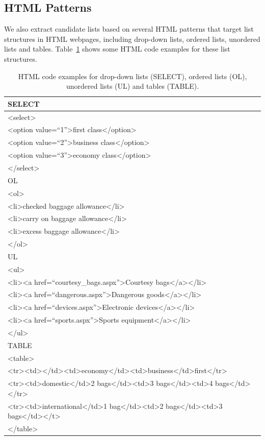 \subsection{HTML Patterns}
We also extract candidate lists based on several HTML patterns that target list structures in HTML webpages, including drop-down lists, ordered lists, unordered lists and tables. Table~\ref{tab:facet-html} shows some HTML code examples for these list structures.
\begin{table}[!ht]
\centering
\caption{HTML code examples for drop-down lists (SELECT), ordered lists (OL), unordered lists (UL) and tables (TABLE).} 
\label{tab:facet-html}
\begin{tabular}{|l|} \hline
SELECT \\\hline
<select>\\
<option value=``1''>first class</option>\\
<option value=``2''>business class</option>\\
<option value=``3''>economy class</option>\\
</select>\\\hline
OL \\\hline
<ol>\\
<li>checked baggage allowance</li>\\
<li>carry on baggage allowance</li>\\
<li>excess baggage allowance</li>\\
</ol>\\\hline
UL \\\hline
<ul> \\
<li><a href=``courtesy\_bags.aspx''>Courtesy bags</a></li>\\
<li><a href=``dangerous.aspx''>Dangerous goods</a></li>\\
<li><a href=``devices.aspx''>Electronic devices</a></li>\\
<li><a href=``sports.aspx''>Sports equipment</a></li>\\
</ul>\\\hline
TABLE \\\hline
<table>\\
\small{<tr><td></td><td>economy</td><td>business</td>first</tr>}\\
\small{<tr><td>domestic</td>2 bags</td><td>3 bags</td><td>4 bags</td></tr>}\\
\small{<tr><td>international</td>1 bag</td><td>2 bags</td><td>3 bags</td></t>}\\
</table>\\\hline
\end{tabular}
\end{table}
